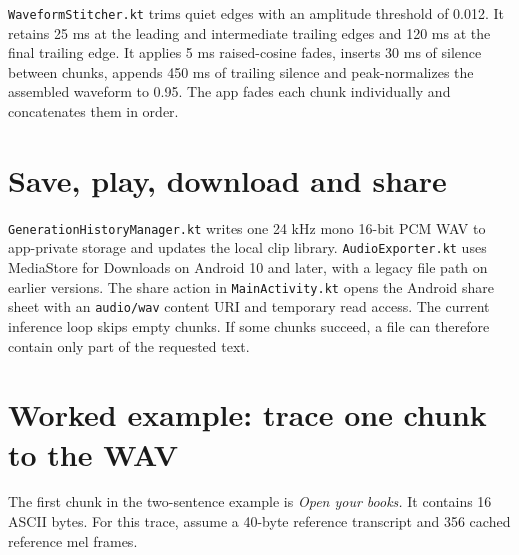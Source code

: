 \texttt{WaveformStitcher.kt} trims quiet edges with an amplitude threshold
of 0.012. It retains 25 ms at the leading and intermediate trailing edges
and 120 ms at the final trailing edge. It applies 5 ms raised-cosine fades,
inserts 30 ms of silence between chunks, appends 450 ms of trailing silence
and peak-normalizes the assembled waveform to 0.95. The app fades each
chunk individually and concatenates them in order.

\section{Save, play, download and share}

\texttt{GenerationHistoryManager.kt} writes one 24 kHz mono 16-bit PCM WAV
to app-private storage and updates the local clip library.
\texttt{AudioExporter.kt} uses MediaStore for Downloads on Android 10 and
later, with a legacy file path on earlier versions. The share action in
\texttt{MainActivity.kt} opens the Android share sheet with an
\texttt{audio/wav} content URI and temporary read access. The current
inference loop skips empty chunks. If some chunks succeed, a file can
therefore contain only part of the requested text.

\section{Worked example: trace one chunk to the WAV}
\label{sec:worked-example}

The first chunk in the two-sentence example is \emph{Open your books.}
It contains 16 ASCII bytes. For this trace, assume a 40-byte reference
transcript and 356 cached reference mel frames.

